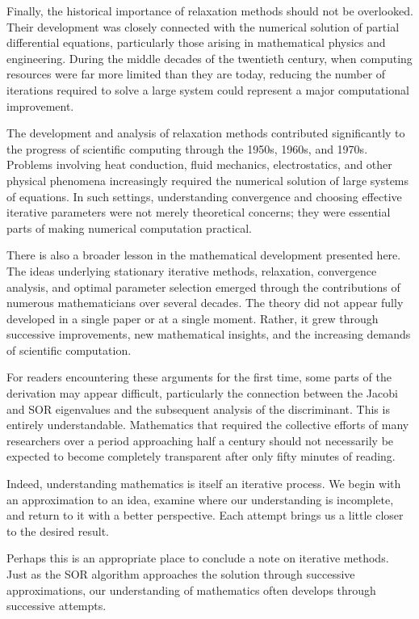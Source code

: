 \documentclass[11pt,a4paper]{article}
\theoremstyle{definition}
\theoremstyle{remark}
\begin{document}
Finally, the historical importance of relaxation methods
should not be overlooked. Their development
was closely connected with the numerical solution
of partial differential equations, particularly
those arising in mathematical physics and
engineering. During the middle decades of the
twentieth century, when computing resources
were far more limited than they are today,
reducing the number of iterations required to
solve a large system could represent a major
computational improvement.

The development and analysis of relaxation
methods contributed significantly to the
progress of scientific computing through the
1950s, 1960s, and 1970s. Problems involving
heat conduction, fluid mechanics, electrostatics,
and other physical phenomena increasingly
required the numerical solution of large
systems of equations. In such settings,
understanding convergence and choosing
effective iterative parameters were not
merely theoretical concerns; they were
essential parts of making numerical
computation practical.

There is also a broader lesson in the
mathematical development presented here.
The ideas underlying stationary iterative
methods, relaxation, convergence analysis,
and optimal parameter selection emerged
through the contributions of numerous
mathematicians over several decades.
The theory did not appear fully developed
in a single paper or at a single moment.
Rather, it grew through successive
improvements, new mathematical insights,
and the increasing demands of scientific
computation.

For readers encountering these arguments
for the first time, some parts of the
derivation may appear difficult, particularly
the connection between the Jacobi and SOR
eigenvalues and the subsequent analysis
of the discriminant. This is entirely
understandable. Mathematics that required
the collective efforts of many researchers
over a period approaching half a century
should not necessarily be expected to
become completely transparent after
only fifty minutes of reading.

Indeed, understanding mathematics is
itself an iterative process. We begin
with an approximation to an idea, examine
where our understanding is incomplete,
and return to it with a better perspective.
Each attempt brings us a little closer
to the desired result.

Perhaps this is an appropriate place
to conclude a note on iterative methods.
Just as the SOR algorithm approaches
the solution through successive
approximations, our understanding of
mathematics often develops through
successive attempts.
\end{document}
